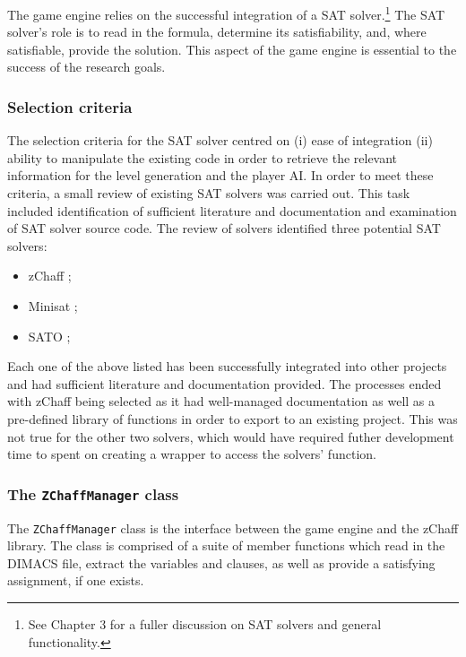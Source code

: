 \documentclass[11pt, a4paper, oneside]{report} %
\begin{document}
The game engine relies on the successful integration of a SAT solver.\footnote{
See Chapter 3 for a fuller discussion on SAT solvers and general functionality.}
The SAT solver's role is to read in the formula, determine its satisfiability,
and, where satisfiable, provide the solution. This aspect of the game engine is
essential to the success of the research goals.

\subsubsection{Selection criteria}

The selection criteria for the SAT solver centred on (i) ease of integration
(ii) ability to manipulate the existing code in order to retrieve the relevant
information for the level generation and the player AI. In order to meet these
criteria, a small review of existing SAT solvers was carried out. This task
included identification of sufficient literature and documentation and
examination of SAT solver source code. The review of solvers identified three
potential SAT solvers:

\begin{itemize}
\item zChaff \cite{fu2004zchaff, moskewicz2001chaff};
\item Minisat \cite{sorensson2005minisat};
\item SATO \cite{zhang1997sato};
\end{itemize}

Each one of the above listed has been successfully integrated into other
projects and had sufficient literature and documentation provided. The processes
ended with zChaff being selected as it had well-managed documentation as well as
a pre-defined library of functions in order to export to an existing project.
This was not true for the other two solvers, which would have required futher
development time to spent on creating a wrapper to access the solvers' function.

\subsubsection{The \texttt{ZChaffManager} class}

The \texttt{ZChaffManager} class is the interface between the game engine and
the zChaff library. The class is comprised of a suite of member functions which
read in the DIMACS file, extract the variables and clauses, as well as provide a
satisfying assignment, if one exists. 
\end{document}
